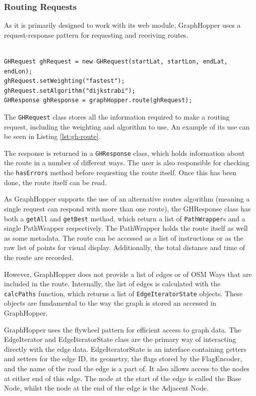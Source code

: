 \documentclass[ %
                    author={Alexander Hill},
                supervisor={Dr. Benjamin Sach},
                    degree={MEng},
                     title={MARMOSET},
                  subtitle={Multi-Agent Route Management using Online Simulation for Efficient Transportation},
                      type={research},
                      year={2016} ]{dissertation}
\begin{document}
\subsubsection{Routing Requests}

As it is primarily designed to work with its web module, GraphHopper uses a
request-response pattern for requesting and receiving routes.

\begin{lstlisting}[label=lst:gh-route,caption={GraphHopper request and response}]

GHRequest ghRequest = new GHRequest(startLat, startLon, endLat, endLon);
ghRequest.setWeighting("fastest");
ghRequest.setAlgorithm("dijkstrabi");
GHResponse ghResponse = graphHopper.route(ghRequest);

\end{lstlisting}

The \texttt{GHRequest} class stores all the information required to make a
routing request, including the weighting and algorithm to use. An example of its
use can be seen in Listing \ref{lst:gh-route}.

The response is returned in a \texttt{GHResponse} class, which holds information
about the route in a number of different ways. The user is also responsible for
checking the \texttt{hasErrors} method before requesting the route itself.  Once
this has been done, the route itself can be read.

As GraphHopper supports the use of an alternative routes algorithm (meaning a
single request can respond with more than one route), the GHResponse class has
both a \texttt{getAll} and \texttt{getBest} method, which return a list of
\texttt{PathWrapper}s and a single PathWrapper respectively. The PathWrapper
holds the route itself as well as some metadata. The route can be accessed as a
list of instructions or as the raw list of points for visual display.
Additionally, the total distance and time of the route are recorded.

However, GraphHopper does not provide a list of edges or of OSM Ways that are
included in the route. Internally, the list of edges is calculated with the
\texttt{calcPaths} function, which returns a list of \texttt{EdgeIteratorState}
objects. These objects are fundamental to the way the graph is stored an
accessed in GraphHopper.

GraphHopper uses the flywheel pattern for efficient access to graph data. The
EdgeIterator and EdgeIteratorState class are the primary way of interacting
directly with the edge data. EdgeIteratorState is an interface containing
getters and setters for the edge ID, its geometry, the flags stored by the
FlagEncoder, and the name of the road the edge is a part of. It also allows
access to the nodes at either end of this edge. The node at the start of the
edge is called the Base Node, whilst the node at the end of the edge is the
Adjacent Node.
\end{document}
